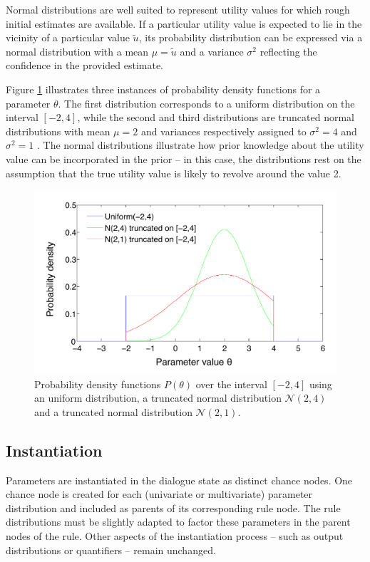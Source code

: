 Normal distributions are well suited to represent utility values for which rough initial estimates are available. If a particular utility value is expected to lie in the vicinity of a particular value $\tilde{u}$, its probability distribution can be expressed via a normal distribution with a mean $\mu = \tilde{u}$ and a variance $\sigma^2$ reflecting the confidence in the provided estimate. 

Figure \ref{fig:uniformn} illustrates three instances of probability density functions for a parameter $\theta$.  The first distribution corresponds to a uniform distribution on the interval $[-2,4]$, while the second and third distributions are truncated normal distributions with mean $\mu=2$ and variances respectively assigned to $\sigma^2=4$ and $\sigma^2=1$ . The normal distributions illustrate how prior knowledge about the utility value can be incorporated in the prior -- in this case, the distributions rest on the assumption that the true utility value is likely to revolve around the value 2. 

\begin{figure}[h]
\centering
\includegraphics[scale=0.45]{imgs/uniformn.pdf}
\caption{Probability density functions $P(\theta)$ over the interval $[-2,4]$ using an uniform distribution, a truncated normal distribution $\mathcal{N}(2,4)$ and a truncated normal distribution $\mathcal{N}(2,1)$.} 
\label{fig:uniformn}
\end{figure}

\subsection{Instantiation}
\label{sec:rule-params-instantiation}

Parameters are instantiated in the dialogue state as distinct chance nodes.  One chance node is created  for each (univariate or multivariate) parameter distribution and included as parents of its corresponding rule node.   The rule distributions must be slightly adapted to factor these parameters in the parent nodes of the rule.  Other aspects of the instantiation process -- such as output distributions or quantifiers -- remain unchanged. 

